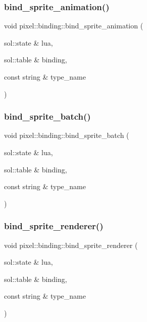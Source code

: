 \mbox{\label{namespacepixel_1_1binding_a37d5dbd00ccd535932c8f2c43146ab2f}} 
\subsubsection{\texorpdfstring{bind\+\_\+sprite\+\_\+animation()}{bind\_sprite\_animation()}}
{\footnotesize\ttfamily void pixel\+::binding\+::bind\+\_\+sprite\+\_\+animation (\begin{DoxyParamCaption}\item[{sol\+::state \&}]{lua,  }\item[{sol\+::table \&}]{binding,  }\item[{const string \&}]{type\+\_\+name }\end{DoxyParamCaption})}

\mbox{\label{namespacepixel_1_1binding_a1ad54a40f2ea5aa27a8dd3a173ae1c18}} 
\subsubsection{\texorpdfstring{bind\+\_\+sprite\+\_\+batch()}{bind\_sprite\_batch()}}
{\footnotesize\ttfamily void pixel\+::binding\+::bind\+\_\+sprite\+\_\+batch (\begin{DoxyParamCaption}\item[{sol\+::state \&}]{lua,  }\item[{sol\+::table \&}]{binding,  }\item[{const string \&}]{type\+\_\+name }\end{DoxyParamCaption})}

\mbox{\label{namespacepixel_1_1binding_abcf205a5df34f7732e65716c10c56b45}} 
\subsubsection{\texorpdfstring{bind\+\_\+sprite\+\_\+renderer()}{bind\_sprite\_renderer()}}
{\footnotesize\ttfamily void pixel\+::binding\+::bind\+\_\+sprite\+\_\+renderer (\begin{DoxyParamCaption}\item[{sol\+::state \&}]{lua,  }\item[{sol\+::table \&}]{binding,  }\item[{const string \&}]{type\+\_\+name }\end{DoxyParamCaption})}

